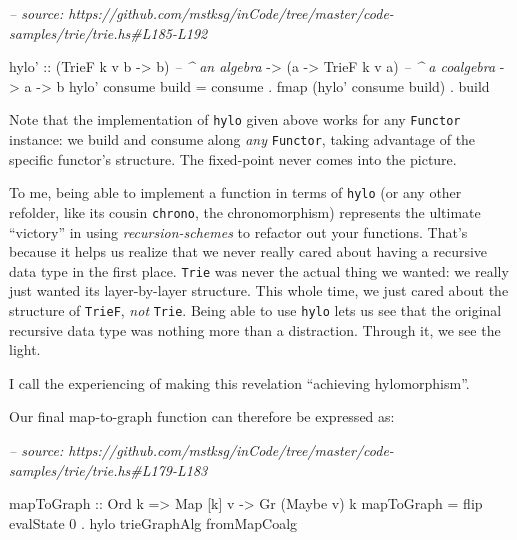 \documentclass[]{article}
\newenvironment{Shaded}{}{}
\newcommand{\CommentTok}[1]{\textcolor[rgb]{0.38,0.63,0.69}{\textit{#1}}}
\newcommand{\DataTypeTok}[1]{\textcolor[rgb]{0.56,0.13,0.00}{#1}}
\newcommand{\DecValTok}[1]{\textcolor[rgb]{0.25,0.63,0.44}{#1}}
\newcommand{\FunctionTok}[1]{\textcolor[rgb]{0.02,0.16,0.49}{#1}}
\newcommand{\NormalTok}[1]{#1}
\newcommand{\OtherTok}[1]{\textcolor[rgb]{0.00,0.44,0.13}{#1}}
\begin{document}
\begin{Shaded}
\begin{Highlighting}[]
\CommentTok{-- source: https://github.com/mstksg/inCode/tree/master/code-samples/trie/trie.hs#L185-L192}

\NormalTok{hylo'}
\OtherTok{    ::}\NormalTok{ (}\DataTypeTok{TrieF}\NormalTok{ k v b }\OtherTok{->}\NormalTok{ b)   }\CommentTok{-- ^ an algebra}
    \OtherTok{->}\NormalTok{ (a }\OtherTok{->} \DataTypeTok{TrieF}\NormalTok{ k v a)   }\CommentTok{-- ^ a coalgebra}
    \OtherTok{->}\NormalTok{ a}
    \OtherTok{->}\NormalTok{ b}
\NormalTok{hylo' consume build }\FunctionTok{=}\NormalTok{ consume}
                    \FunctionTok{.} \FunctionTok{fmap}\NormalTok{ (hylo' consume build)}
                    \FunctionTok{.}\NormalTok{ build}
\end{Highlighting}
\end{Shaded}

Note that the implementation of \texttt{hylo} given above works for any
\texttt{Functor} instance: we build and consume along \emph{any}
\texttt{Functor}, taking advantage of the specific functor's structure. The
fixed-point never comes into the picture.

To me, being able to implement a function in terms of \texttt{hylo} (or any
other refolder, like its cousin \texttt{chrono}, the chronomorphism) represents
the ultimate ``victory'' in using \emph{recursion-schemes} to refactor out your
functions. That's because it helps us realize that we never really cared about
having a recursive data type in the first place. \texttt{Trie} was never the
actual thing we wanted: we really just wanted its layer-by-layer structure. This
whole time, we just cared about the structure of \texttt{TrieF}, \emph{not}
\texttt{Trie}. Being able to use \texttt{hylo} lets us see that the original
recursive data type was nothing more than a distraction. Through it, we see the
light.

I call the experiencing of making this revelation ``achieving hylomorphism''.

Our final map-to-graph function can therefore be expressed as:

\begin{Shaded}
\begin{Highlighting}[]
\CommentTok{-- source: https://github.com/mstksg/inCode/tree/master/code-samples/trie/trie.hs#L179-L183}

\NormalTok{mapToGraph}
\OtherTok{    ::} \DataTypeTok{Ord}\NormalTok{ k}
    \OtherTok{=>} \DataTypeTok{Map}\NormalTok{ [k] v}
    \OtherTok{->} \DataTypeTok{Gr}\NormalTok{ (}\DataTypeTok{Maybe}\NormalTok{ v) k}
\NormalTok{mapToGraph }\FunctionTok{=} \FunctionTok{flip}\NormalTok{ evalState }\DecValTok{0} \FunctionTok{.}\NormalTok{ hylo trieGraphAlg fromMapCoalg}
\end{Highlighting}
\end{Shaded}
\end{document}
